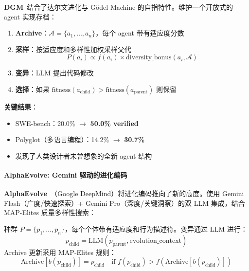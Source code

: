\textbf{DGM}~\citep{darwingodelmachine2025}结合了达尔文进化与 Gödel Machine 的自指特性。维护一个开放式的 agent 实现存档：

\begin{enumerate}
\item \textbf{Archive}：$\mathcal{A} = \{a_1, \ldots, a_n\}$，每个 agent 带有适应度分数
\item \textbf{采样}：按适应度和多样性加权采样父代
\begin{equation}
P(a_i) \propto f(a_i) \times \text{diversity\_bonus}(a_i, \mathcal{A})
\label{eq:dgm-sample}
\end{equation}
\item \textbf{变异}：LLM 提出代码修改
\item \textbf{选择}：如果 $\text{fitness}(a_{\mathrm{child}}) > \text{fitness}(a_{\mathrm{parent}})$ 则保留
\end{enumerate}

\textbf{关键结果}：
\begin{itemize}
\item SWE-bench：20.0\% $\rightarrow$ \textbf{50.0\% verified}
\item Polyglot（多语言编程）：14.2\% $\rightarrow$ \textbf{30.7\%}
\item 发现了人类设计者未曾想象的全新 agent 结构
\end{itemize}

\paragraph{AlphaEvolve: Gemini 驱动的进化编码}

\textbf{AlphaEvolve}~\citep{alphaevolve2025}（Google DeepMind）将进化编码推向了新的高度。使用 Gemini Flash（广度/快速探索）+ Gemini Pro（深度/关键洞察）的双 LLM 集成，结合 MAP-Elites 质量多样性搜索：

\begin{definition}
种群 $P = \{p_1, \ldots, p_n\}$，每个个体带有适应度和行为描述符。变异通过 LLM 进行：
\begin{equation}
p_{\mathrm{child}} = \mathrm{LLM}(p_{\mathrm{parent}}, \text{evolution\_context})
\label{eq:alphaevolve-mutate}
\end{equation}
Archive 更新采用 MAP-Elites 规则：
\begin{equation}
\text{Archive}[b(p_{\mathrm{child}})] = p_{\mathrm{child}} \quad \text{if } f(p_{\mathrm{child}}) > f(\text{Archive}[b(p_{\mathrm{child}})])
\label{eq:alphaevolve-archive}
\end{equation}
\end{definition}

